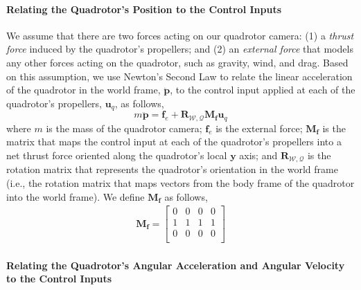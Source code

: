 \paragraph{Relating the Quadrotor's Position to the Control Inputs}

We assume that there are two forces acting on our quadrotor camera: (1) a \emph{thrust force} induced by the quadrotor's propellers; and (2) an \emph{external force} that models any other forces acting on the quadrotor, such as gravity, wind, and drag.
Based on this assumption, we use Newton's Second Law to relate the linear acceleration of the quadrotor in the world frame, $\ddot{\mathbf{p}}$, to the control input applied at each of the quadrotor's propellers, $\mathbf{u}_q$, as follows,
%
\begin{equation}
m \ddot{\mathbf{p}} = \mathbf{f}_e + \mathbf{R}_{\mathcal{W},\mathcal{Q}} \mathbf{M}_{\mathbf{f}} \mathbf{u}_q
\label{eqn:ch2:m_p_dot_dot}
\end{equation}
%
where $m$ is the mass of the quadrotor camera; $\mathbf{f}_e$ is the external force; $\mathbf{M}_{\mathbf{f}}$ is the matrix that maps the control input at each of the quadrotor's propellers into a net thrust force oriented along the quadrotor's local $\mathbf{y}$ axis; and $\mathbf{R}_{\mathcal{W},\mathcal{Q}}$ is the rotation matrix that represents the quadrotor's orientation in the world frame (i.e., the rotation matrix that maps vectors from the body frame of the quadrotor into the world frame).
We define $\mathbf{M}_{\mathbf{f}}$ as follows, 
%
\begin{equation}
\begin{aligned}
%
\mathbf{M}_{\mathbf{f}} =
\begin{bmatrix}
0 & 0 & 0 & 0 \\
1 & 1 & 1 & 1 \\
0 & 0 & 0 & 0 \\
\end{bmatrix}
%
\end{aligned}
\end{equation}

\paragraph{Relating the Quadrotor's Angular Acceleration and Angular Velocity to the Control Inputs}

